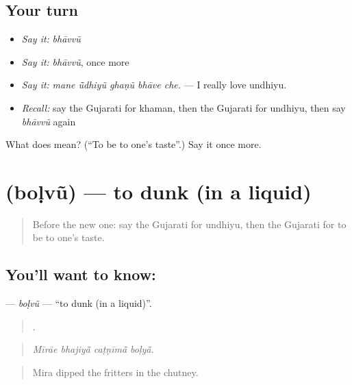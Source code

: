 \subsection*{Your turn}
\begin{itemize}
\raggedright
  \item \emph{Say it:} \emph{bhāvvũ}
  \item \emph{Say it:} \emph{bhāvvũ}, once more
  \item \emph{Say it:} \emph{mane ū̃dhiyũ ghaṇũ bhāve che.} — I really love undhiyu.
  \item \emph{Recall:} say the Gujarati for khaman, then the Gujarati for undhiyu, then say \emph{bhāvvũ} again
\end{itemize}

\begin{tcolorbox}[breakable,colback=teal!4,colframe=teal!35!black,title={Before you move on}]
What does  mean? (\textquotedblleft{}To be to one's taste\textquotedblright{}.) Say it once more.
\end{tcolorbox}
\section[\texorpdfstring{\gu{બોળવું} (boḷvũ)}{બોળવું (boḷvũ)}]{ (boḷvũ) — to dunk (in a liquid)}

\label{lesson:GU-C523-bolvu-dip}



\begin{quote}
Before the new one: say the Gujarati for undhiyu, then the Gujarati for to be to one's taste.
\end{quote}

\subsection*{You'll want to know: }
\textbf{} — \emph{boḷvũ} — \textquotedblleft{}to dunk (in a liquid)\textquotedblright{}.

\begin{quote}
   .
\end{quote}

\begin{quote}
\emph{Mīrāe bhajiyā̃ caṭṇīmā̃ boḷyā̃.}
\end{quote}

\begin{quote}
Mira dipped the fritters in the chutney.
\end{quote}

